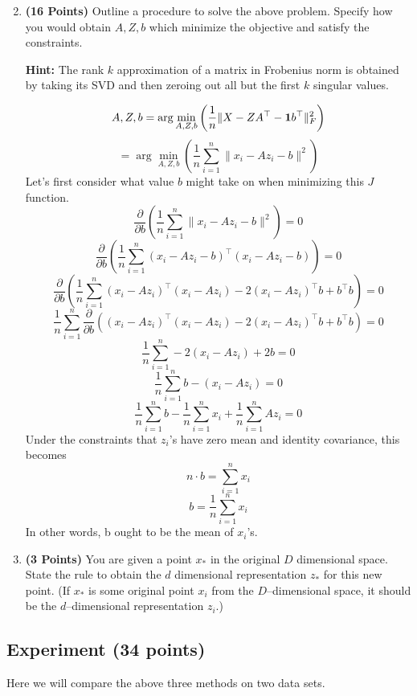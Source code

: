 \documentclass[a4paper]{article}
\newcommand*{\one}{{\bf 1}}
\theoremstyle{definition}
\newenvironment{soln}{
	\leavevmode\color{blue}\ignorespaces
}{}
\begin{document}
\begin{enumerate}
\setcounter{enumi}{1}
\item \textbf{(16 Points)}
Outline a procedure to solve the above problem. Specify how you
would obtain $A, Z, b$ which minimize the objective and satisfy the constraints.

\textbf{Hint: }The rank $k$ approximation of a matrix in Frobenius norm is obtained by
taking its SVD and then zeroing out all but the first $k$ singular values.

\begin{soln}
	$$A, Z, b = \arg \min_{A, Z, b} \left( \frac{1}{n} \| X - ZA^\top - \one b^\top\|_F^2 \right)$$
	$$ = \arg \min_{A, Z, b} \left( \frac{1}{n} \sum_{i=1}^n \|x_i - Az_i - b\|^2 \right)$$
	Let's first consider what value $b$ might take on when minimizing this $J$ function.
	$$\frac{\partial}{\partial b} \left( \frac{1}{n} \sum_{i=1}^n \|x_i - Az_i - b\|^2 \right) = 0$$
	$$\frac{\partial}{\partial b} \left( \frac{1}{n} \sum_{i=1}^n (x_i - Az_i - b)^\top (x_i - Az_i - b) \right) = 0$$
	$$\frac{\partial}{\partial b} \left( \frac{1}{n} \sum_{i=1}^n (x_i - Az_i)^\top (x_i - Az_i) - 2(x_i - Az_i)^\top b + b^\top b \right) = 0$$
	$$\frac{1}{n} \sum_{i=1}^n \frac{\partial}{\partial b} \left((x_i - Az_i)^\top (x_i - Az_i) - 2(x_i - Az_i)^\top b + b^\top b \right) = 0$$
	$$\frac{1}{n} \sum_{i=1}^n -2(x_i - Az_i) + 2b = 0$$
	$$\frac{1}{n} \sum_{i=1}^n b - (x_i - Az_i) = 0$$
	$$\frac{1}{n} \sum_{i=1}^n b - \frac{1}{n} \sum_{i=1}^n x_i + \frac{1}{n} \sum_{i=1}^n Az_i = 0$$
	Under the constraints that $z_i$'s have zero mean and identity covariance, this becomes
	$$n \cdot b = \sum_{i=1}^n x_i$$
	$$b = \frac{1}{n} \sum_{i=1}^n x_i$$
	In other words, b ought to be the mean of $x_i$'s.
\end{soln}

\item \textbf{(3 Points)}
You are given a point $x_*$ in the original $D$ dimensional space.
State the rule to obtain the $d$ dimensional
representation $z_*$ for this new point.
(If $x_*$ is some original point $x_i$ from the $D$--dimensional space, it should be the
$d$--dimensional representation $z_i$.)


\end{enumerate}


\subsection{Experiment (34 points)}

Here we will compare the above three methods on two data sets. 
\end{document}
